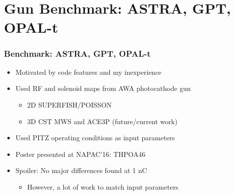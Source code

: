 \documentclass{beamer}
\begin{document}
\section{Gun Benchmark: ASTRA, GPT, OPAL-t}
\begin{frame}
  \frametitle{Benchmark: ASTRA, GPT, OPAL-t}
  \begin{itemize}
    \item{Motivated by code features and my inexperience}
    \item{Used RF and solenoid maps from AWA photocathode gun}
    \begin{itemize}
    	\item 2D SUPERFISH/POISSON
    	\item 3D CST MWS and ACE3P (future/current work)
    \end{itemize}
    \item{Used PITZ operating conditions as input parameters}
    \item{Poster presented at NAPAC'16: THPOA46}
    \item{Spoiler: No major differences found at 1 nC}
        \begin{itemize}
        	\item However, a lot of work to match input parameters
        \end{itemize}
  \end{itemize}
\end{frame}
\end{document}
